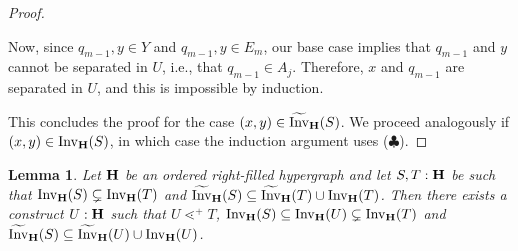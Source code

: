 \documentclass{article}
\theoremstyle{plain}
\newtheorem{lemma}[thm]{Lemma}
\theoremstyle{definition}
\newcommand{\Invt}{\widetilde{\mathrm{Inv}}}
\newcommand{\Inv}{{\mathrm{Inv}}}
\begin{document}
\begin{proof}
\begin{itemize}
Now, since $q_{m-1},y\in Y$ and $q_{m-1},y\in E_m$, our base case implies that $q_{m-1}$ and $y$ cannot be separated in $U$, i.e., that $q_{m-1}\in A_j$. Therefore, $x$ and $q_{m-1}$ are separated in $U$, and this is impossible by induction.
\end{itemize}
This concludes the proof for the case $(x,y)\in \Invt_{\bf H}(S)$. We proceed analogously if $(x,y)\in \Inv_{\bf H}(S)$, in which case the induction argument uses ($\clubsuit$).
 \end{proof}


\begin{lemma}\label{s13}
Let ${\bf H}$ be an ordered right-filled hypergraph and let $S,T:{\bf H}$ be such that $\Inv_{\bf H}(S)\subsetneq \Inv_{\bf H}(T)$ and $\Invt_{\bf H}(S)\subseteq \Invt_{\bf H}(T)\cup \Inv_{\bf H}(T)$. Then there exists a construct $U:{\bf H}$ such that $U\lessdot^+ T$, $\Inv_{\bf H}(S)\subseteq \Inv_{\bf H}(U)\subsetneq \Inv_{\bf H}(T)$ and $\Invt_{\bf H}(S)\subseteq \Invt_{\bf H}(U)\cup \Inv_{\bf H}(U)$. 
\end{lemma}
\end{document}
